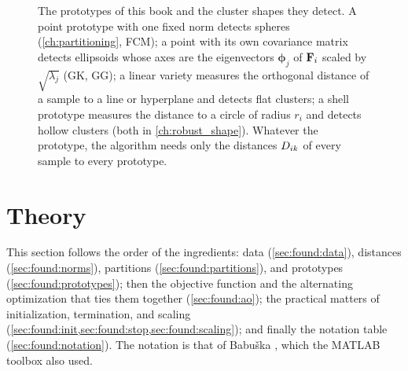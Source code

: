 \begin{figure}[htbp]
\caption[The prototypes of this book and the cluster shapes they detect.]{The prototypes of this book and the cluster shapes they detect. A point prototype with one fixed norm detects spheres (\cref{ch:partitioning}, FCM); a point with its own covariance matrix detects ellipsoids whose axes are the eigenvectors $\boldsymbol\phi_j$ of $\mathbf{F}_i$ scaled by $\sqrt{\lambda_j}$ (GK, GG); a linear variety measures the orthogonal distance of a sample to a line or hyperplane and detects flat clusters; a shell prototype measures the distance to a circle of radius $r_i$ and detects hollow clusters (both in \cref{ch:robust_shape}). Whatever the prototype, the algorithm needs only the distances $D_{ik}$ of every sample to every prototype.}
\label{fig:found:prototypes}
\end{figure}

\section{Theory}\label{sec:found:theory}

This section follows the order of the ingredients: data (\cref{sec:found:data}), distances (\cref{sec:found:norms}), partitions (\cref{sec:found:partitions}), and prototypes (\cref{sec:found:prototypes}); then the objective function and the alternating optimization that ties them together (\cref{sec:found:ao}); the practical matters of initialization, termination, and scaling (\cref{sec:found:init,sec:found:stop,sec:found:scaling}); and finally the notation table (\cref{sec:found:notation}). The notation is that of Babu\v{s}ka \cite{babuska:1998:book}, which the MATLAB toolbox \cite{balasko:2005:toolbox} also used.

